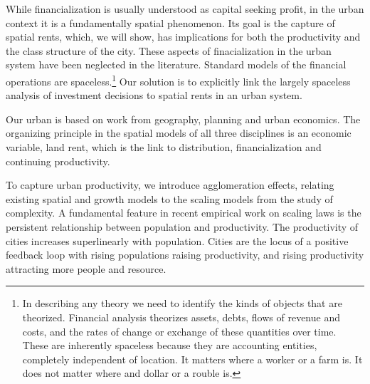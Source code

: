 While financialization is usually understood as capital seeking profit, in the urban context it is a fundamentally spatial phenomenon. %
Its goal is the capture of spatial rents, which, we will show, has implications for both the productivity and the class structure of the city. These aspects of finacialization in the urban system have been neglected in the literature. Standard models of the financial operations are spaceless.\footnote{In describing any theory we need to identify the kinds of objects that are theorized. Financial analysis theorizes  assets, debts, flows of revenue and costs, and the rates of change or exchange of these quantities over time. These are inherently spaceless because they are accounting entities, completely independent of location. It matters where a worker or a farm is. It does not matter where and dollar or a rouble is.} 
Our solution is to explicitly link the largely spaceless analysis of investment decisions to spatial rents in an urban system. 

Our urban is based on work from %
geography, planning and urban economics. 
The organizing principle in the spatial models of all three disciplines is an economic variable, land rent, which is the link to distribution, financialization and continuing productivity. %

To capture urban productivity, we introduce %
agglomeration effects, relating existing spatial and growth models to the scaling models from the study of complexity. A fundamental feature in recent empirical work on scaling laws is %
the persistent relationship between population and productivity. The productivity of cities increases superlinearly with population. Cities are the locus of a positive feedback loop with rising populations raising productivity, and rising productivity attracting more people and resource.

